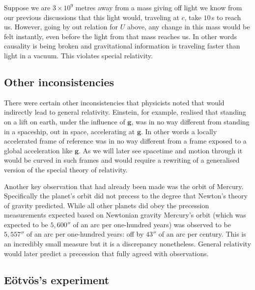 \documentclass[english,seminar]{lecture}
\begin{document}
Suppose we are $3\times 10^9$ metres away from a mass giving off light we know from our previous discussions that this light would, traveling at $c$, take $10\,$s to reach us. However, going by out relation for $U$ above, any change in this mass would be felt instantly, even before the light from that mass reaches us. In other words causality is being broken and gravitational information is traveling faster than light in a vacuum. This violates special relativity.

\subsection{Other inconsistencies} \label{sec:newtonian-inconsistencies}

There were certain other inconsistencies that physicists noted that would indirectly lead to general relativity. Einstein, for example, realised that standing on a lift on earth, under the influence of $\textbf{g}$, was in no way different from standing in a spaceship, out in space, accelerating at $\mathbf{g}$. In other words a locally accelerated frame of reference was in no way different from a frame exposed to a global acceleration like $\mathbf{g}$. As we will later see spacetime and motion through it would be curved in such frames and would require a rewriting of a generalised version of the special theory of relativity.

Another key observation that had already been made was the orbit of Mercury. Specifically the planet's orbit did not precess to the degree that Newton's theory of gravity predicted. While all other planets did obey the precession measurements expected based on Newtonian gravity Mercury's orbit (which was expected to be $5,600''$ of an arc per one-hundred years) was observed to be $5,557''$ of an arc per one-hundred years: off by $43''$ of an arc per century. This is an incredibly small measure but it is a discrepancy nonetheless. General relativity would later predict a precession that fully agreed with observations.

\subsection{E\"{o}tv\"{o}s's experiment}
\end{document}

